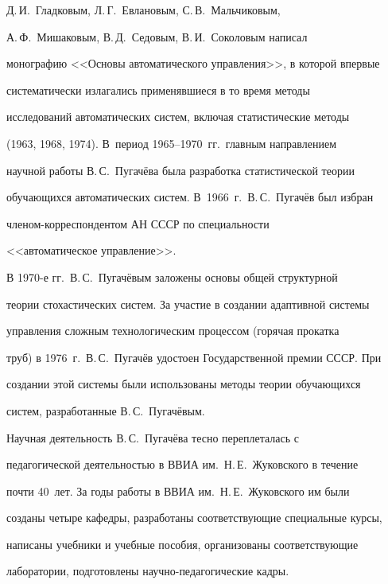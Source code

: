 Д.\,И.~Гладковым, Л.\,Г.~Евлановым, С.\,В.~Мальчиковым, 


А.\,Ф.~Мишаковым, В.\,Д.~Седовым, В.\,И.~Соколовым написал 


монографию <<Основы автоматического управления>>, в которой впервые 


систематически излагались применявшиеся в то время методы 


исследований автоматических систем, включая статистические методы 


(1963, 1968, 1974). В~период 1965--1970~гг.\ главным направлением 


научной работы В.\,С.~Пугачёва была разработка статистической теории 


обучающихся автоматических систем. В~1966~г.\ В.\,С.~Пугачёв был избран 


чле\-ном-кор\-рес\-пон\-ден\-том АН СССР по специальности 


<<автоматическое управление>>. 


     


     В 1970-е гг.\ В.\,С.~Пугачёвым заложены основы общей структурной 


теории стохастических систем. За участие в создании адаптивной системы 


управления сложным технологическим процессом (горячая прокатка 


труб) в 1976~г.\ В.\,С.~Пугачёв удостоен Государственной премии СССР. При 


создании этой сис\-те\-мы были использованы методы теории обучающихся 


сис\-тем, разработанные В.\,С.~Пугачёвым.


     


     Научная деятельность В.\,С.~Пугачёва тесно переплеталась с 


педагогической деятельностью в ВВИА им.\ Н.\,Е.~Жуковского в течение 


почти 40~лет. За годы работы в ВВИА им.\ Н.\,Е.~Жуковского им были 


созданы четыре кафедры, разработаны соответствующие специальные курсы, 


написаны учебники и учебные пособия, организованы соответствующие 


лаборатории, подготовлены на\-уч\-но-пе\-да\-го\-ги\-че\-ские кадры.


     


